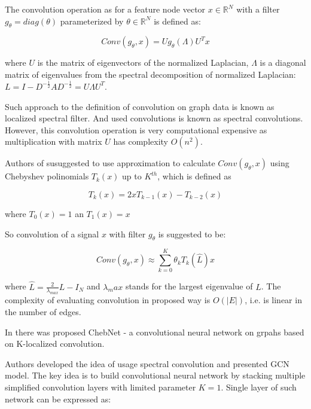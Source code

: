 The convolution operation  as for a feature node vector $x \in \mathbb{R}^N$ with a
filter $g_\theta = diag(\theta)$ parameterized by $\theta \in \mathbb{R}^N$ is defined as:


\begin{equation}
    Conv(g_\theta,x) = Ug_\theta(\Lambda)U^{T}x
    \label{eq:simple_conv}
 \end{equation}


where $U$ is the matrix of eigenvectors of the normalized Laplacian, $\Lambda$ is a diagonal matrix of 
eigenvalues from the spectral decomposition of normalized Laplacian: $L = I - D^{-\frac{1}{2}}AD^{-\frac{1}{2}} = U\Lambda U^{T}$.

Such approach to the definition of convolution on graph data is known as localized spectral filter. And used convolutions is known as 
spectral convolutions.
However, this convolution operation is very computational expensive as multiplication with matrix $U$ has complexity $O(n^2)$.


Authors of \cite{ChebAppr} susuggested to use approximation to calculate 
$Conv(g_\theta,x)$ using Chebyshev polinomials $T_k(x)$ up to $K^{th}$, which is defined as 

\begin{equation}
    T_k (x) = 2xT_{k-1}(x) - T_{k-2}(x)
    \label{eq:cheb_polynom}
 \end{equation}


where $T_0(x)=1$ an $T_1(x)=x$

So convolution of a signal $x$ with filter $g_\theta$ is suggested to be:

\begin{equation}
    Conv(g_\theta,x) \approx \sum_{k=0}^{K}{\theta}_k T_k(\hat{L})x
    \label{eq:conv_appr}
 \end{equation}

where $\hat{L} = \frac{2}{\lambda_{max}}L-I_N$ and $\lambda_max$ 
stands for the largest eigenvalue of $L$.
The complexity of evaluating convolution in proposed way is $O(|E|)$, i.e. is linear in the number of edges.

In \cite{ChebNet} there was proposed ChebNet - a convolutional neural network on grpahs based on K-localized convolution.

Authors \cite{GCN} developed the idea of usage spectral convolution and presented GCN model. The key idea is to build
convolutional neural network by stacking multiple simplified convolution layers with limited parameter $K=1$.
Single layer of such network can be expressed as: 

